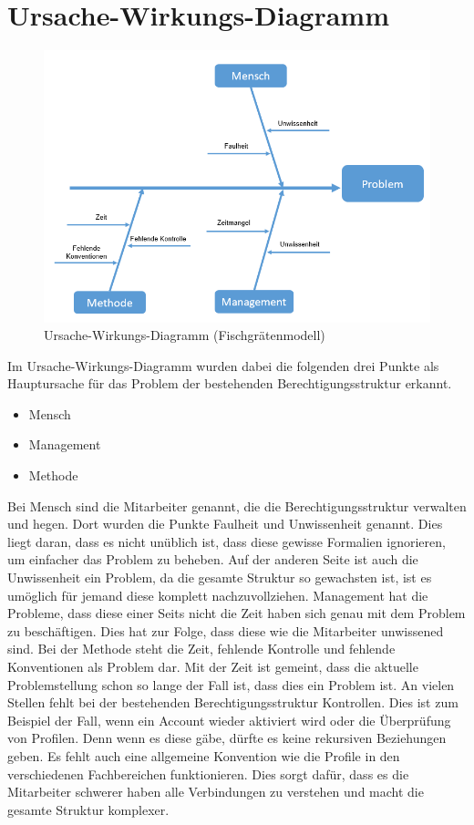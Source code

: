 \section{Ursache-Wirkungs-Diagramm}
\label{sec:intro:UWD}
\begin{figure}[h!]
 \centering
 \includegraphics[width=1\textwidth]{gfx/Picture/Fisch.PNG}
 \caption{Ursache-Wirkungs-Diagramm (Fischgrätenmodell)}
 \label{fig:Fisch}
\end{figure}
Im Ursache-Wirkungs-Diagramm wurden dabei die folgenden drei Punkte als Hauptursache für das Problem der bestehenden Berechtigungsstruktur erkannt.
\begin{itemize}
	\item Mensch
	\item Management
	\item Methode
\end{itemize}
Bei Mensch sind die Mitarbeiter genannt, die die Berechtigungsstruktur verwalten und hegen.
Dort wurden die Punkte Faulheit und Unwissenheit genannt.
Dies liegt daran, dass es nicht unüblich ist, dass diese gewisse Formalien ignorieren, um einfacher das Problem zu beheben.
Auf der anderen Seite ist auch die Unwissenheit ein Problem, da die gesamte Struktur so gewachsten ist, ist es umöglich für jemand diese komplett nachzuvollziehen.
\newline
Management hat die Probleme, dass diese einer Seits nicht die Zeit haben sich genau mit dem Problem zu beschäftigen.
Dies hat zur Folge, dass diese wie die Mitarbeiter unwissened sind.
\newline
Bei der Methode steht die Zeit, fehlende Kontrolle und fehlende Konventionen als Problem dar.
Mit der Zeit ist gemeint, dass die aktuelle Problemstellung schon so lange der Fall ist, dass dies ein Problem ist.
An vielen Stellen fehlt bei der bestehenden Berechtigungsstruktur Kontrollen.
Dies ist zum Beispiel der Fall, wenn ein Account wieder aktiviert wird oder die Überprüfung von Profilen.
Denn wenn es diese gäbe, dürfte es keine rekursiven Beziehungen geben.
Es fehlt auch eine allgemeine Konvention wie die Profile in den verschiedenen Fachbereichen funktionieren.
Dies sorgt dafür, dass es die Mitarbeiter schwerer haben alle Verbindungen zu verstehen und macht die gesamte Struktur komplexer.